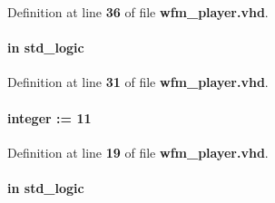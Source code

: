 Definition at line {\bf 36} of file {\bf wfm\+\_\+player.\+vhd}.

\paragraph[{wfm\+\_\+load}]{ {\bfseries \textcolor{keywordflow}{in}\textcolor{vhdlchar}{ }} {\bfseries \textcolor{comment}{std\+\_\+logic}\textcolor{vhdlchar}{ }} \hspace{0.3cm}{\ttfamily [Port]}}\label{classwfm__player_a3d169846da42e9b1a5f04bce97dd2fff}


Definition at line {\bf 31} of file {\bf wfm\+\_\+player.\+vhd}.

\paragraph[{wfm\+\_\+outfifo\+\_\+size}]{ {\bfseries \textcolor{vhdlchar}{ }} {\bfseries \textcolor{comment}{integer}\textcolor{vhdlchar}{ }\textcolor{vhdlchar}{ }\textcolor{vhdlchar}{\+:}\textcolor{vhdlchar}{=}\textcolor{vhdlchar}{ }\textcolor{vhdlchar}{ } \textcolor{vhdldigit}{11} \textcolor{vhdlchar}{ }} \hspace{0.3cm}{\ttfamily [Generic]}}\label{classwfm__player_a34c7f4f72360546393d9261a065de65a}


Definition at line {\bf 19} of file {\bf wfm\+\_\+player.\+vhd}.

\paragraph[{wfm\+\_\+play\+\_\+stop}]{ {\bfseries \textcolor{keywordflow}{in}\textcolor{vhdlchar}{ }} {\bfseries \textcolor{comment}{std\+\_\+logic}\textcolor{vhdlchar}{ }} \hspace{0.3cm}{\ttfamily [Port]}}\label{classwfm__player_aec820bcf21fff0d393f59c1e0478385c}


